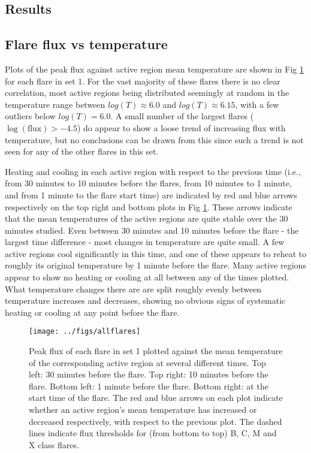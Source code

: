 \documentclass[namedreferences]{solarphysics}
\begin{document}
\begin{article}
\section{Results}

\subsection{Flare flux vs temperature}
Plots of the peak flux against active region mean temperature are shown in Fig \ref{fig:flux-v-temp} for each flare in set 1.
For the vast majority of these flares there is no clear correlation, most active regions being distributed seemingly at random in the temperature range between $log(T)\approx6.0$ and $log(T)\approx6.15$, with a few outliers below $log(T)=6.0$.
A small number of the largest flares ($\log(\text{flux}) > -4.5$) do appear to show a loose trend of increasing flux with temperature, but no conclusions can be drawn from this since such a trend is not seen for any of the other flares in this set.

Heating and cooling in each active region with respect to the previous time (i.e., from 30 minutes to 10 minutes before the flares, from 10 minutes to 1 minute, and from 1 minute to the flare start time) are indicated by red and blue arrows respectively on the top right and bottom plots in Fig \ref{fig:flux-v-temp}.
These arrows indicate that the mean temperatures of the active regions are quite stable over the 30 minutes studied.
Even between 30 minutes and 10 minutes before the flare - the largest time difference - most changes in temperature are quite small.
A few active regions cool significantly in this time, and one of these appears to reheat to roughly its original temperature by 1 minute before the flare.
Many active regions appear to show no heating or cooling at all between any of the times plotted.
What temperature changes there are are split roughly evenly between temperature increases and decreases, showing no obvious signs of systematic heating or cooling at any point before the flare.

\begin{figure}
\begin{centering}
\texttt{[image: ../figs/allflares]} 
\par\end{centering}

\caption{Peak flux of each flare in set 1 plotted against the mean temperature of the corresponding active region at several different times.
Top left: 30 minutes before the flare.
Top right: 10 minutes before the flare.
Bottom left: 1 minute before the flare.
Bottom right: at the start time of the flare.
The red and blue arrows on each plot indicate whether an active region's mean temperature has increased or decreased respectively, with respect to the previous plot.
The dashed lines indicate flux thresholds for (from bottom to top) B, C, M and X class flares.\label{fig:flux-v-temp}}
\end{figure}


\end{article}
\end{document}
